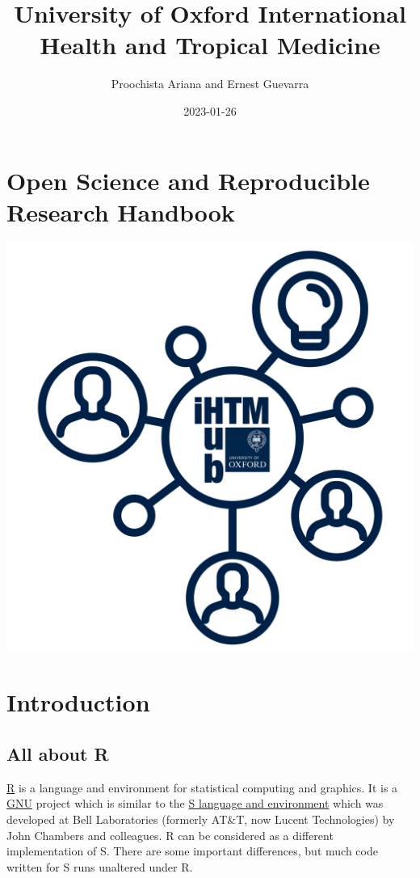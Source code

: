 \documentclass[
  12pt,
]{book}
\title{University of Oxford International Health and Tropical Medicine}
\author{Proochista Ariana and Ernest Guevarra}
\date{2023-01-26}
\begin{document}
\maketitle

{
\hypersetup{linkcolor=}
\setcounter{tocdepth}{1}
\tableofcontents
}
\hypertarget{open-science-and-reproducible-research-handbook}{%
\chapter*{Open Science and Reproducible Research Handbook}\label{open-science-and-reproducible-research-handbook}}

\includegraphics{images/ihtm_small.png}

\hypertarget{introduction}{%
\chapter{Introduction}\label{introduction}}

\hypertarget{all-about-r}{%
\section{All about R}\label{all-about-r}}

\href{https://r-project.org}{R} is a language and environment for statistical computing and graphics. It is a \href{https://en.wikipedia.org/wiki/GNU}{GNU} project which is similar to the \href{https://en.wikipedia.org/wiki/S_(programming_language)}{S language and environment} which was developed at Bell Laboratories (formerly AT\&T, now Lucent Technologies) by John Chambers and colleagues. R can be considered as a different implementation of S. There are some important differences, but much code written for S runs unaltered under R.
\end{document}
